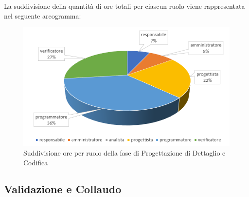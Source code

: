 La suddivisione della quantità di ore totali per ciascun ruolo viene rappresentata nel seguente areogramma:

\begin{figure}[h]
	\centering
	\caption{Suddivisione ore per ruolo della fase di Progettazione di Dettaglio e Codifica}
	
	\includegraphics[scale=2.8]{sezioni/Aerogrammi/AerogrammaDiDettaglio.png}
\end{figure}

\clearpage
\subsection{Validazione e Collaudo}

